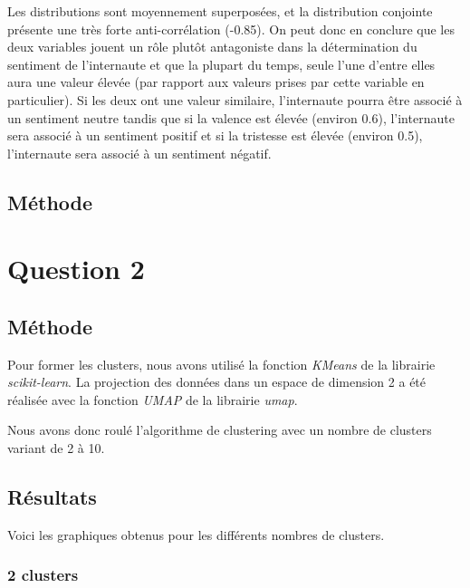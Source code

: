 \documentclass{article}
\begin{document}
Les distributions sont moyennement superposées, et la distribution conjointe présente une très
forte anti-corrélation (-0.85). On peut donc en conclure que les deux variables jouent
un rôle plutôt antagoniste dans la détermination du sentiment de l'internaute et que
la plupart du temps, seule l'une d'entre elles aura une valeur élevée 
(par rapport aux valeurs prises par cette variable en particulier). Si les deux ont une
valeur similaire, l'internaute pourra être associé à un sentiment neutre tandis que
si la valence est élevée (environ 0.6), l'internaute sera associé à un sentiment positif et
si la tristesse est élevée (environ 0.5), l'internaute sera associé à un sentiment négatif.

\subsection*{Méthode}


\newpage

\section*{Question 2}

\subsection*{Méthode}

Pour former les clusters, nous avons utilisé la fonction \textit{KMeans} de la librairie 
\textit{scikit-learn}. La projection des données dans un espace de dimension 2 a été réalisée
avec la fonction \textit{UMAP} de la librairie \textit{umap}. 

Nous avons donc roulé l'algorithme de clustering avec un nombre de clusters variant de 2 à 10.

\subsection*{Résultats}

Voici les graphiques obtenus pour les différents nombres de clusters.

\subsubsection*{2 clusters}
\end{document}

